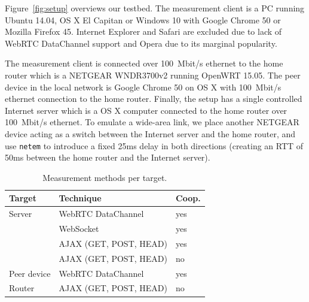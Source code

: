 \documentclass[12pt,twoside]{book}
\begin{document}
Figure~\ref{fig:setup} overviews our testbed. 
The measurement client is a PC running Ubuntu 14.04, OS X El Capitan or Windows 10 with Google Chrome 50 or Mozilla Firefox 45. 
Internet Explorer and Safari are excluded due to lack of WebRTC DataChannel support and Opera due to its marginal popularity. 

The measurement client is connected over 100~Mbit/s ethernet to the home router which is a NETGEAR WNDR3700v2 running OpenWRT 15.05. The peer device in the local network is Google Chrome 50 on OS X with 100~Mbit/s ethernet connection to the home router. Finally, the setup has a single controlled Internet server which is a OS X computer connected to the home router over 100~Mbit/s ethernet. To emulate a wide-area link, we place another NETGEAR device acting as a switch between the Internet server and the home router, and use \texttt{netem} to introduce a fixed 25ms delay in both directions (creating an RTT of 50ms between the home router and the Internet server).

\begin{table}[tb]
\label{tab:targets}
\centering
\begin{small}
\begin{tabular}{l l l}
\toprule
\textbf{Target} & \textbf{Technique} & \textbf{Coop.} \\
\midrule
Server & WebRTC DataChannel & yes \\
            & WebSocket & yes  \\
	    & AJAX (GET, POST, HEAD) & yes \\
	    & AJAX (GET, POST, HEAD) & no \\
\midrule
Peer device & WebRTC DataChannel & yes \\
\midrule
Router & AJAX (GET, POST, HEAD) & no \\
\bottomrule
\end{tabular}
\end{small}
\caption {Measurement methods per target.} 
\label{tab:targets}
\end{table}
\end{document}
